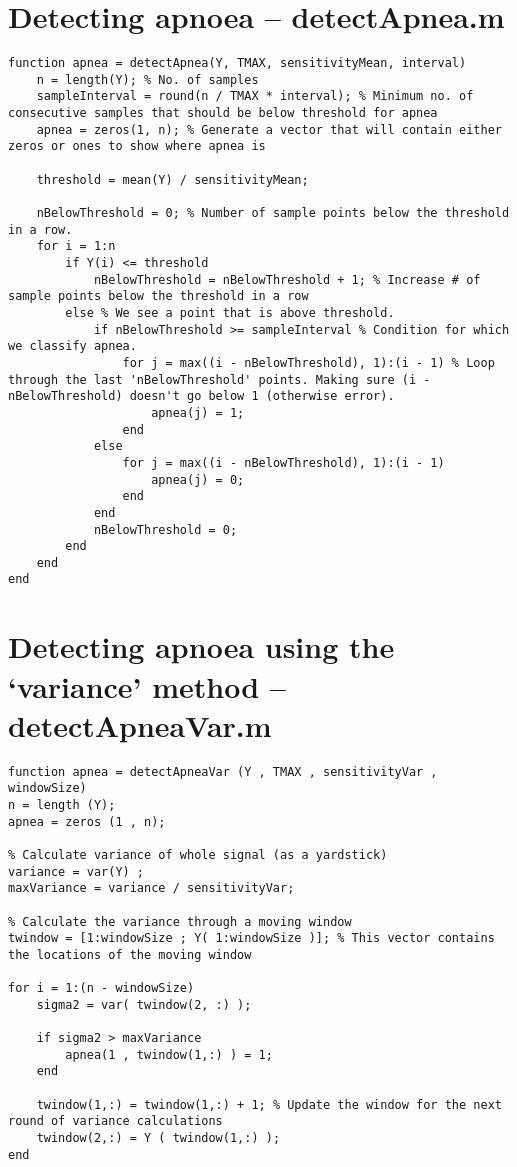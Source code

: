 \section{Detecting apnoea -- detectApnea.m}
\label{sec:detectApnea}
\begin{lstlisting}
function apnea = detectApnea(Y, TMAX, sensitivityMean, interval)
    n = length(Y); % No. of samples
    sampleInterval = round(n / TMAX * interval); % Minimum no. of consecutive samples that should be below threshold for apnea
    apnea = zeros(1, n); % Generate a vector that will contain either zeros or ones to show where apnea is
    
    threshold = mean(Y) / sensitivityMean;
    
    nBelowThreshold = 0; % Number of sample points below the threshold in a row.
	for i = 1:n
        if Y(i) <= threshold
            nBelowThreshold = nBelowThreshold + 1; % Increase # of sample points below the threshold in a row
        else % We see a point that is above threshold.
            if nBelowThreshold >= sampleInterval % Condition for which we classify apnea.
                for j = max((i - nBelowThreshold), 1):(i - 1) % Loop through the last 'nBelowThreshold' points. Making sure (i - nBelowThreshold) doesn't go below 1 (otherwise error).
                    apnea(j) = 1;
                end
            else
                for j = max((i - nBelowThreshold), 1):(i - 1)
                    apnea(j) = 0;
                end
            end
            nBelowThreshold = 0;
        end
    end
end
\end{lstlisting}

\section{Detecting apnoea using the `variance' method -- detectApneaVar.m}
\label{sec:detectApneaVar}
\begin{lstlisting}
function apnea = detectApneaVar (Y , TMAX , sensitivityVar , windowSize)
n = length (Y);
apnea = zeros (1 , n);

% Calculate variance of whole signal (as a yardstick)
variance = var(Y) ;
maxVariance = variance / sensitivityVar;

% Calculate the variance through a moving window
twindow = [1:windowSize ; Y( 1:windowSize )]; % This vector contains the locations of the moving window

for i = 1:(n - windowSize)
    sigma2 = var( twindow(2, :) );
    
    if sigma2 > maxVariance 
        apnea(1 , twindow(1,:) ) = 1;
    end
    
    twindow(1,:) = twindow(1,:) + 1; % Update the window for the next round of variance calculations
    twindow(2,:) = Y ( twindow(1,:) );
end
\end{lstlisting}